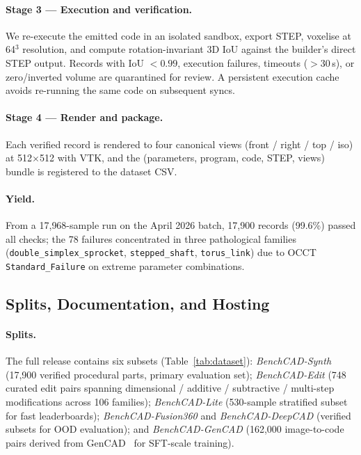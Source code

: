 \documentclass{article}
\begin{document}
\paragraph{Stage 3 --- Execution and verification.} We re-execute the emitted code in an isolated sandbox, export STEP, voxelise at 64$^3$ resolution, and compute rotation-invariant 3D IoU against the builder's direct STEP output. Records with IoU $< 0.99$, execution failures, timeouts ($>$30\,s), or zero/inverted volume are quarantined for review. A persistent execution cache avoids re-running the same code on subsequent syncs.

\paragraph{Stage 4 --- Render and package.} Each verified record is rendered to four canonical views (front / right / top / iso) at 512$\times$512 with VTK, and the (parameters, program, code, STEP, views) bundle is registered to the dataset CSV.

\paragraph{Yield.} From a 17{,}968-sample run on the April 2026 batch, 17{,}900 records (99.6\%) passed all checks; the 78 failures concentrated in three pathological families (\texttt{double\_simplex\_sprocket}, \texttt{stepped\_shaft}, \texttt{torus\_link}) due to OCCT \texttt{Standard\_Failure} on extreme parameter combinations.

\subsection{Splits, Documentation, and Hosting}
\paragraph{Splits.} The full release contains six subsets (Table~\ref{tab:dataset}): \emph{BenchCAD-Synth} (17{,}900 verified procedural parts, primary evaluation set); \emph{BenchCAD-Edit} (748 curated edit pairs spanning dimensional / additive / subtractive / multi-step modifications across 106 families); \emph{BenchCAD-Lite} (530-sample stratified subset for fast leaderboards); \emph{BenchCAD-Fusion360} and \emph{BenchCAD-DeepCAD} (verified subsets for OOD evaluation); and \emph{BenchCAD-GenCAD} (162{,}000 image-to-code pairs derived from GenCAD~\citep{GenCAD2025} for SFT-scale training).
\end{document}
